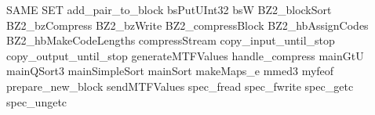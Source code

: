 SAME SET
add_pair_to_block
bsPutUInt32
bsW
BZ2_blockSort
BZ2_bzCompress
BZ2_bzWrite
BZ2_compressBlock
BZ2_hbAssignCodes
BZ2_hbMakeCodeLengths
compressStream
copy_input_until_stop
copy_output_until_stop
generateMTFValues
handle_compress
mainGtU
mainQSort3
mainSimpleSort
mainSort
makeMaps_e
mmed3
myfeof
prepare_new_block
sendMTFValues
spec_fread
spec_fwrite
spec_getc
spec_ungetc

